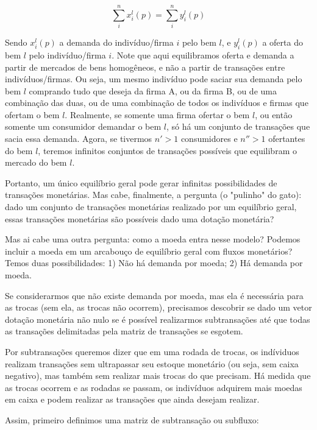 \documentclass{article}
\begin{document}
$$ \sum^{n}_{i}x^l_i(p) = \sum^n_{i} y^l_i(p)$$

\par Sendo $x^l_i(p)$ a demanda do indivíduo/firma $i$ pelo bem $l$, e $y^l_i(p)$ a oferta do bem $l$ pelo indivíduo/firma $i$. Note que aqui equilibramos oferta e demanda a partir de mercados de bens homogêneos, e não a partir de transações entre indivíduos/firmas. Ou seja, um mesmo indivíduo pode saciar sua demanda pelo bem $l$ comprando tudo que deseja da firma A, ou da firma B, ou de uma combinação das duas, ou de uma combinação de todos os indivíduos e firmas que ofertam o bem $l$. Realmente, se somente uma firma ofertar o bem $l$, ou então somente um consumidor demandar o bem $l$, só há um conjunto de transações que sacia essa demanda. Agora, se tivermos $n'>1$ consumidores e $n''>1$ ofertantes do bem $l$, teremos infinitos conjuntos de transações possíveis que equilibram o mercado do bem $l$. 

\par Portanto, um único equilíbrio geral pode gerar infinitas possibilidades de transações monetárias. Mas cabe, finalmente, a pergunta (o "pulinho" do gato): dado um conjunto de transações monetárias realizado por um equilíbrio geral, essas transações monetárias são possíveis dado uma dotação monetária?

\par Mas ai cabe uma outra pergunta: como a moeda entra nesse modelo? Podemos incluir a moeda em um arcabouço de equilíbrio geral com fluxos monetários? Temos duas possibilidades: 1) Não há demanda por moeda; 2) Há demanda por moeda. 

\par Se considerarmos que não existe demanda por moeda, mas ela é necessária para as trocas (sem ela, as trocas não ocorrem), precisamos descobrir se dado um vetor dotação monetária não nulo se é possível realizarmos subtransações até que todas as transações delimitadas pela matriz de transações se esgotem.

\par Por subtransações queremos dizer que em uma rodada de trocas, os indíviduos realizam transações sem ultrapassar seu estoque monetário (ou seja, sem caixa negativo), mas também sem realizar mais trocas do que precisam. Há medida que as trocas ocorrem e as rodadas se passam, os indivíduos adquirem mais moedas em caixa e podem realizar as transações que ainda desejam realizar. 

\par Assim, primeiro definimos uma matriz de subtransação ou subfluxo:
\end{document}
